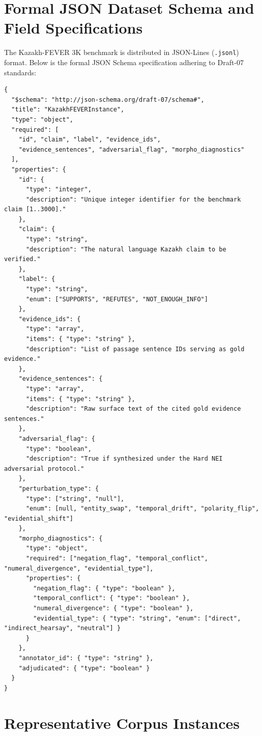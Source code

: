 \section{Formal JSON Dataset Schema and Field Specifications}
\label{sec:app_fever_schema}

The Kazakh-FEVER 3K benchmark is distributed in JSON-Lines (\texttt{.jsonl}) format. Below is the formal JSON Schema specification adhering to Draft-07 standards:

\begin{small}
\begin{verbatim}
{
  "$schema": "http://json-schema.org/draft-07/schema#",
  "title": "KazakhFEVERInstance",
  "type": "object",
  "required": [
    "id", "claim", "label", "evidence_ids",
    "evidence_sentences", "adversarial_flag", "morpho_diagnostics"
  ],
  "properties": {
    "id": {
      "type": "integer",
      "description": "Unique integer identifier for the benchmark claim [1..3000]."
    },
    "claim": {
      "type": "string",
      "description": "The natural language Kazakh claim to be verified."
    },
    "label": {
      "type": "string",
      "enum": ["SUPPORTS", "REFUTES", "NOT_ENOUGH_INFO"]
    },
    "evidence_ids": {
      "type": "array",
      "items": { "type": "string" },
      "description": "List of passage sentence IDs serving as gold evidence."
    },
    "evidence_sentences": {
      "type": "array",
      "items": { "type": "string" },
      "description": "Raw surface text of the cited gold evidence sentences."
    },
    "adversarial_flag": {
      "type": "boolean",
      "description": "True if synthesized under the Hard NEI adversarial protocol."
    },
    "perturbation_type": {
      "type": ["string", "null"],
      "enum": [null, "entity_swap", "temporal_drift", "polarity_flip", "evidential_shift"]
    },
    "morpho_diagnostics": {
      "type": "object",
      "required": ["negation_flag", "temporal_conflict", "numeral_divergence", "evidential_type"],
      "properties": {
        "negation_flag": { "type": "boolean" },
        "temporal_conflict": { "type": "boolean" },
        "numeral_divergence": { "type": "boolean" },
        "evidential_type": { "type": "string", "enum": ["direct", "indirect_hearsay", "neutral"] }
      }
    },
    "annotator_id": { "type": "string" },
    "adjudicated": { "type": "boolean" }
  }
}
\end{verbatim}
\end{small}

\section{Representative Corpus Instances}
\label{sec:app_fever_instances}

